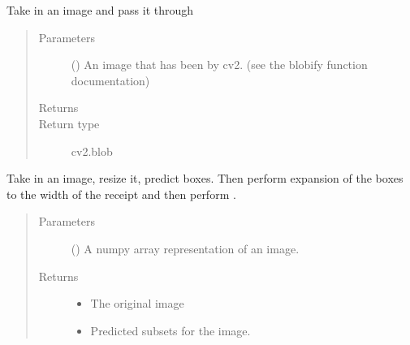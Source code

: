 \documentclass[letterpaper,10pt,english]{sphinxmanual}
\begin{document}
\begin{fulllineitems}
\label{\detokenize{api:readpyne.core.blobify}}
Take in an image and pass it through 
\begin{quote}\begin{description}
\item[{Parameters}] \leavevmode
{} () \textendash{} An image that has been  by cv2.
(see the blobify function documentation)

\item[{Returns}] \leavevmode


\item[{Return type}] \leavevmode
cv2.blob

\end{description}\end{quote}

\end{fulllineitems}


\begin{fulllineitems}
\label{\detokenize{api:readpyne.core.boxes}}
Take in an image, resize it, predict boxes. Then perform
expansion of the boxes to the width of the receipt and then
perform .
\begin{quote}\begin{description}
\item[{Parameters}] \leavevmode
{} () \textendash{} A numpy array representation of an image.

\item[{Returns}] \leavevmode
\begin{itemize}
\item {} 
 \textendash{} The original image

\item {} 
 \textendash{} Predicted subsets for the image.

\end{itemize}


\end{description}\end{quote}

\end{fulllineitems}
\end{document}
